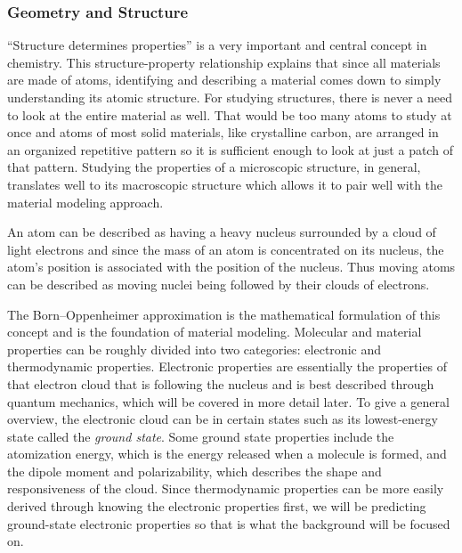 \documentclass[12pt, abstract = true]{scrartcl}
\begin{document}
\subsubsection{Geometry and Structure}
``Structure determines properties'' is a very important and central concept in chemistry. 
This structure-property relationship explains that since all materials are made of atoms, identifying 
and describing a material comes down to simply understanding its atomic structure. For studying 
structures, there is never a need to look at the entire material as well. That would be too many 
atoms to study at once and atoms of most solid materials, like crystalline carbon, are arranged in 
an organized repetitive pattern so it is sufficient enough to look at just a patch of that pattern. 
Studying the properties of a microscopic structure, in general, translates well to its macroscopic 
structure which allows it to pair well with the material modeling approach.


An atom can be described as having a heavy nucleus surrounded by a cloud of light 
electrons and since the mass of an atom is concentrated on its nucleus, the atom's 
position is associated with the position of the nucleus. Thus moving atoms can be described
as moving nuclei being followed by their clouds of electrons. 



The Born–Oppenheimer approximation is the mathematical formulation of this concept and 
is the foundation of material modeling. Molecular and material properties can be 
roughly divided into two categories: electronic and thermodynamic properties. Electronic 
properties are essentially the properties of that electron cloud that is following the 
nucleus and is best described through quantum mechanics, which will be covered in more 
detail later. To give a general overview, the electronic cloud can be in certain states 
such as its lowest-energy state called the \emph{ground state}. Some ground state properties include the atomization energy, which is the energy released when a molecule is formed, and the 
dipole moment and polarizability, which describes the shape and responsiveness of the
cloud. Since thermodynamic properties can be more easily derived through knowing the electronic 
properties first, we will be predicting ground-state electronic properties 
so that is what the background will be focused on. 
\end{document}
